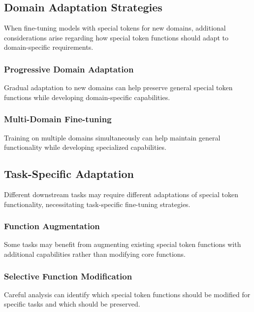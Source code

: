 \subsection{Domain Adaptation Strategies}

When fine-tuning models with special tokens for new domains, additional considerations arise regarding how special token functions should adapt to domain-specific requirements.

\subsubsection{Progressive Domain Adaptation}

Gradual adaptation to new domains can help preserve general special token functions while developing domain-specific capabilities.

\subsubsection{Multi-Domain Fine-tuning}

Training on multiple domains simultaneously can help maintain general functionality while developing specialized capabilities.

\subsection{Task-Specific Adaptation}

Different downstream tasks may require different adaptations of special token functionality, necessitating task-specific fine-tuning strategies.

\subsubsection{Function Augmentation}

Some tasks may benefit from augmenting existing special token functions with additional capabilities rather than modifying core functions.

\subsubsection{Selective Function Modification}

Careful analysis can identify which special token functions should be modified for specific tasks and which should be preserved.